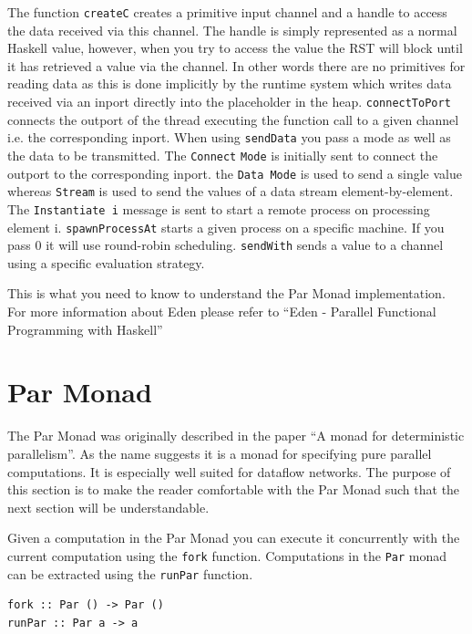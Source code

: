 \documentclass[a4paper, oneside, final]{article}
\begin{document}
The function \texttt{createC} creates a primitive input channel and a
handle to access the data received via this channel. The handle is
simply represented as a normal Haskell value, however, when you try to
access the value the RST will block until it has retrieved a value via
the channel. In other words there are no primitives for reading data
as this is done implicitly by the runtime system which writes data
received via an inport directly into the placeholder in the heap.
\texttt{connectToPort} connects the outport of the thread executing
the function call to a given channel i.e. the corresponding inport.
When using \texttt{sendData} you pass a mode as well as the data to be
transmitted. The \texttt{Connect} \texttt{Mode} is initially sent to
connect the outport to the corresponding inport. the \texttt{Data
Mode} is used to send a single value whereas \texttt{Stream} is used
to send the values of a data stream element-by-element. The
\texttt{Instantiate i} message is sent to start a remote process on
processing element i.  \texttt{spawnProcessAt} starts a given process
on a specific machine.  If you pass 0 it will use round-robin
scheduling. \texttt{sendWith}  sends a value to a channel using a
specific evaluation strategy.

This is what you need to know to understand the Par Monad
implementation. For more information about Eden please refer
to ``Eden - Parallel Functional Programming with Haskell''\cite{eden}

\section{Par Monad}
\label{sec:parmonad}

The Par Monad was originally described in the paper ``A monad for deterministic parallelism''\cite{parmonad}. As the name suggests it is a monad for specifying pure parallel computations. It is especially well suited for dataflow networks. The purpose of this section is to make the reader comfortable with the Par Monad such that the next section will be understandable.

Given a computation in the Par Monad you can execute it concurrently with the current computation using the \texttt{fork} function. Computations in the \texttt{Par} monad can be extracted using the \texttt{runPar} function. \newline

\begin{lstlisting}
fork :: Par () -> Par ()
runPar :: Par a -> a
\end{lstlisting}
\end{document}
